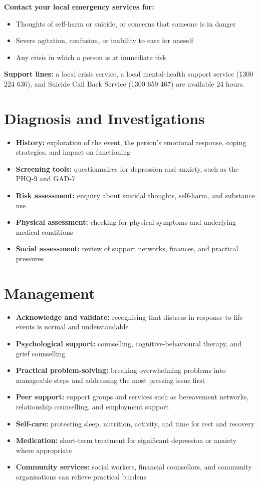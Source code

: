 \textbf{Contact your local emergency services for:}
\begin{itemize}
    \item Thoughts of self-harm or suicide, or concerns that someone is in danger
    \item Severe agitation, confusion, or inability to care for oneself
    \item Any crisis in which a person is at immediate risk
\end{itemize}
\textbf{Support lines:} a local crisis service, a local mental-health support service (1300 224 636), and Suicide Call Back Service (1300 659 467) are available 24 hours.

\section*{Diagnosis and Investigations}
\begin{itemize}
    \item \textbf{History:} exploration of the event, the person's emotional response, coping strategies, and impact on functioning
    \item \textbf{Screening tools:} questionnaires for depression and anxiety, such as the PHQ-9 and GAD-7
    \item \textbf{Risk assessment:} enquiry about suicidal thoughts, self-harm, and substance use
    \item \textbf{Physical assessment:} checking for physical symptoms and underlying medical conditions
    \item \textbf{Social assessment:} review of support networks, finances, and practical pressures
\end{itemize}

\section*{Management}
\begin{itemize}
    \item \textbf{Acknowledge and validate:} recognising that distress in response to life events is normal and understandable
    \item \textbf{Psychological support:} counselling, cognitive-behavioural therapy, and grief counselling
    \item \textbf{Practical problem-solving:} breaking overwhelming problems into manageable steps and addressing the most pressing issue first
    \item \textbf{Peer support:} support groups and services such as bereavement networks, relationship counselling, and employment support
    \item \textbf{Self-care:} protecting sleep, nutrition, activity, and time for rest and recovery
    \item \textbf{Medication:} short-term treatment for significant depression or anxiety where appropriate
    \item \textbf{Community services:} social workers, financial counsellors, and community organisations can relieve practical burdens
\end{itemize}

